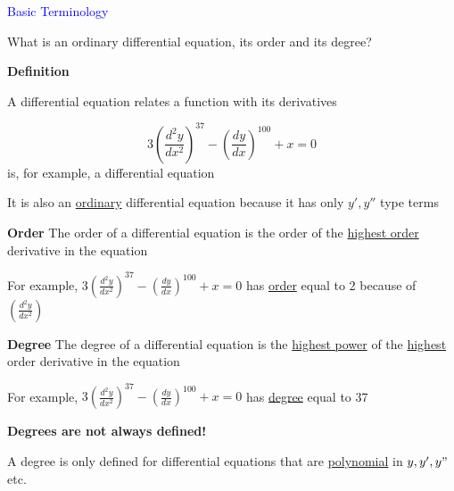 \documentclass[14pt,fleqn]{extarticle}
\begin{document}
\begin{skill}
\begin{narrow}
\textcolor{blue}{Basic Terminology} 

What is an ordinary differential
equation, its order and its degree?
\end{narrow}

%

\reason

\textbf{Definition}

A differential equation relates a
function with its derivatives

\[ 3\left(\frac{d^2y }{dx^2}\right)^{37} - \left(\frac{dy}{dx}\right)^{100} + x = 0\] 
is, for example, a differential equation \newline 

It is also an \underline{ordinary} differential
equation because it has only $y', y''$
type terms \newline 

\textbf{Order} 
The order of a differential equation is 
the order of the \underline{highest order} derivative
in the equation

For example, $3\left(\frac{d^2y }{dx^2}\right)^{37} - \left(\frac{dy}{dx}\right)^{100} + x = 0$ has \underline{order} equal to 2 because of $\left(\frac{d^2y}{dx^2}\right)$\newline 


\textbf{Degree}
The degree of a differential equation is
the \underline{highest power} of the \underline{highest} order
derivative in the equation\newline 

For example, $3\left(\frac{d^2y }{dx^2}\right)^{37} - \left(\frac{dy}{dx}\right)^{100} + x = 0$  has \underline{degree} equal to 37 \newline 

\textbf{Degrees are not always defined!}

A degree is only defined for differential 
equations that are \underline{polynomial}
in $y,y',y"$ etc.
%

\end{skill}
\end{document}
